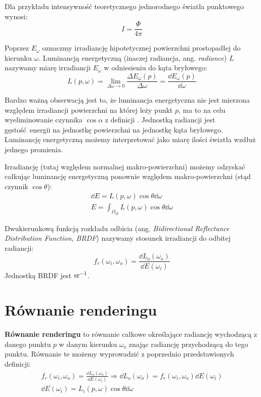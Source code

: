 \documentclass[../main.tex]{subfiles}
\begin{document}
Dla przykładu intensywność teoretycznego jednorodnego światła punktowego wynosi:
\[
  I = \frac{\Phi}{4\pi}
\]

Poprzez $E_{\omega}$ oznaczmy irradiancję hipotetycznej powierzchni
prostopadłej do kierunku $\omega$. Luminancją energetyczną (inaczej radiancja, ang. \textit{radiance}) $L$ nazywamy miarę irradiancji $E_{\omega}$ w odniesieniu do kąta bryłowego:
\[
L(p, \omega) = \lim_{\Delta\omega \rightarrow 0} {
  \frac{\Delta E_{\omega} (p)}{\Delta\omega}
} =
\frac{\dd E_{\omega}(p)}{\dd \omega}
\]

Bardzo ważną obserwacją jest to, że luminancja energetyczna nie jest mierzona względem irradiancji powierzchni na której leży punkt $p$, ma to na celu wyeliminowanie czynnika $\cos \alpha$ z definicji \cite[str. 339]{pbrt}. Jednostką radiancji jest gęstość energii na jednostkę powierzchni na jednostkę kąta bryłowego. Luminancję energetyczną możemy interpretować jako miarę ilości światła wzdłuż jednego promienia.

Irradiancję (tutaj względem normalnej makro-powierzchni) możemy odzyskać całkując luminancję energetyczną ponownie względem makro-powierzchni (stąd czynnik $\cos\theta$):
\begin{gather*}
    \dd E = L(p, \omega) \cos\theta \dd \omega \\
    E = \int_{\Omega_H}{L(p, \omega) \cos\theta \dd \omega}
\end{gather*}

Dwukierunkową funkcją rozkładu odbicia (ang. \textit{Bidirectional Reflectance Distribution Function, BRDF}) nazywamy stosunek irradiancji do odbitej radiancji:
\[
f_r(\omega_i, \omega_o) = \frac{
    \dd L_{o}(\omega_o)
}{
    \dd E(\omega_i)
}
\]
\noindent Jednostką BRDF jest $\si[per-mode=reciprocal]{\per\steradian}$.

\section{Równanie renderingu}

\textbf{Równanie renderingu} to równanie całkowe określające radiancję wychodzącą z danego punktu $p$ w danym kierunku $\omega_o$ znając radiancję przychodzącą do tego punktu. Równanie te możemy
wyprowadzić z poprzednio przedstawionych definicji:
\begin{gather*}
    f_r(\omega_i, \omega_o) = \frac{
        \dd L_{o}(\omega_o)
    }{
        \dd E(\omega_i)
    } \Rightarrow 
    \dd L_{o}(\omega_o) =  f_r(\omega_i, \omega_o) \dd E(\omega_i) \\
    \dd E(\omega_i) = L_i(p, \omega) \cos\theta \dd\omega
\end{gather*}
\end{document}

